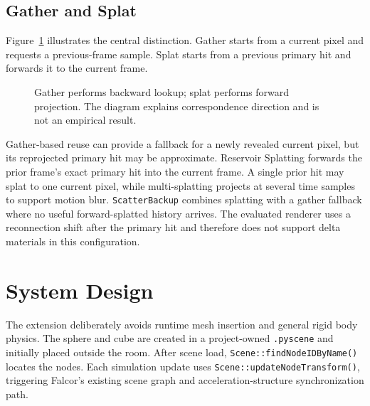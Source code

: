 \documentclass[10pt,twocolumn]{article}
\newcommand{\method}[1]{\texttt{#1}}
\begin{document}
\subsection{Gather and Splat}

Figure~\ref{fig:gather-splat} illustrates the central distinction. Gather
starts from a current pixel and requests a previous-frame sample. Splat starts
from a previous primary hit and forwards it to the current frame.

\begin{figure}[t]
\centering
{}
\caption{Gather performs backward lookup; splat performs forward projection.
The diagram explains correspondence direction and is not an empirical result.}
\label{fig:gather-splat}
\end{figure}

Gather-based reuse can provide a fallback for a newly revealed current pixel,
but its reprojected primary hit may be approximate. Reservoir Splatting
forwards the prior frame's exact primary hit into the current frame. A single
prior hit may splat to one current pixel, while multi-splatting projects at
several time samples to support motion blur. \method{ScatterBackup} combines
splatting with a gather fallback where no useful forward-splatted history
arrives. The evaluated renderer uses a reconnection shift after the primary
hit and therefore does not support delta materials in this configuration.

\section{System Design}

The extension deliberately avoids runtime mesh insertion and general rigid
body physics. The sphere and cube are created in a project-owned
\texttt{.pyscene} and initially placed outside the room. After scene load,
\texttt{Scene::findNodeIDByName()} locates the nodes. Each simulation update
uses \texttt{Scene::updateNodeTransform()}, triggering Falcor's existing scene
graph and acceleration-structure synchronization path.
\end{document}
